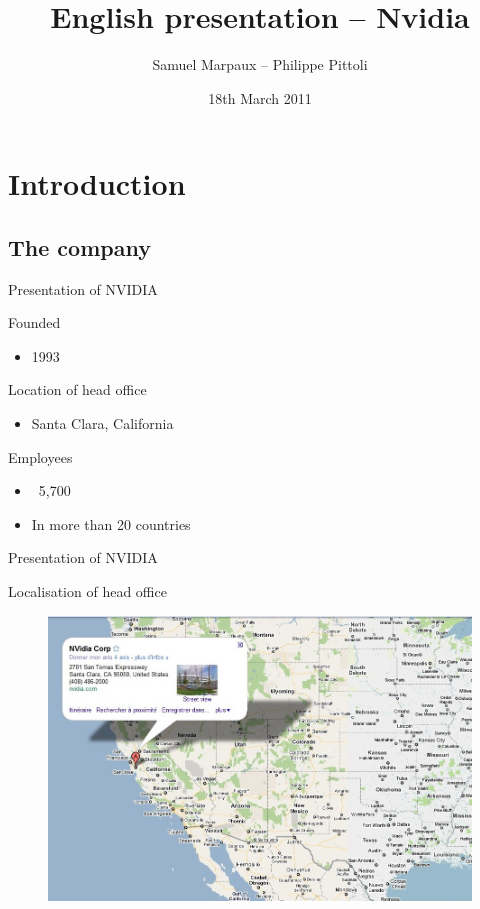\documentclass{beamer}
\date{18th March 2011}
\author{Samuel Marpaux -- Philippe Pittoli}
\title[Nvidia]{English presentation -- Nvidia}
\begin{document}

\section{Introduction}
\subsection{The company}
\begin{frame}{Presentation of NVIDIA}
	\transdissolve[duration=0.03]

	\begin{block}{Founded}
		\begin{itemize}
			\item<+->{1993}
		\end{itemize}
	\end{block}	
	\pause
	\begin{block}{Location of head office}
		\begin{itemize}
			\item<+->{Santa Clara, California}
		\end{itemize}
	\end{block}
	\pause
	\begin{block}{Employees}
		\begin{itemize}
			\item<+->{~5,700}
			\item<+->{In more than 20 countries}
		\end{itemize}
	\end{block}
\end{frame}

\begin{frame}{Presentation of NVIDIA}
	\transdissolve[duration=0.08]
	\begin{block}{Localisation of head office}
	\begin{figure}[h]
		\includegraphics[width=1.05\textheight]{images/nvidiamap.jpg}
	\end{figure}
	\end{block}
\end{frame}
\end{document}
